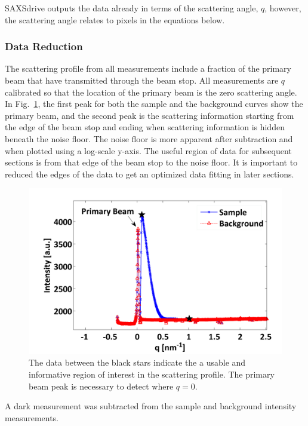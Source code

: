 \documentclass[10pt]{article}%
\begin{document}
SAXSdrive outputs the data already in terms of the scattering angle, $q$, however, the scattering angle relates to pixels in the equations below. 

\subsubsection{Data Reduction}
The scattering profile from all measurements include a fraction of the primary beam that have transmitted through the beam stop. All measurements are $q$ calibrated so that the location of the primary beam is the zero scattering angle. In Fig.~\ref{datareduction}, the first peak for both the sample and the background curves show the primary beam, and the second peak is the scattering information starting from the edge of the beam stop and ending when scattering information is hidden beneath the noise floor. The noise floor is more apparent after subtraction and when plotted using a log-scale y-axis. The useful region of data for subsequent sections is from that edge of the beam stop to the noise floor. It is important to reduced the edges of the data to get an optimized data fitting in later sections.
     
\begin{figure}[h]
\centering
\includegraphics[scale=.5]{images/datareduction.png}
\caption{The data between the black stars indicate the a usable and informative region of interest in the scattering profile. The primary beam peak is necessary to detect where $q=0$.}
\label{datareduction}
\end{figure}



A dark measurement was subtracted from the sample and background intensity measurements.
\end{document}
